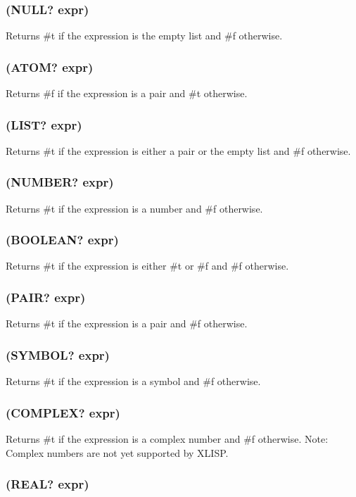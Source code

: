 \documentclass[11pt]{article}
\begin{document}
\subsubsection{(NULL? expr)}
\label{sec-4-23-1}

Returns \#t if the expression is the empty list and \#f otherwise.
\subsubsection{(ATOM? expr)}
\label{sec-4-23-2}

Returns \#f if the expression is a pair and \#t otherwise.
\subsubsection{(LIST? expr)}
\label{sec-4-23-3}

Returns \#t if the expression is either a pair or the empty list
and \#f otherwise.
\subsubsection{(NUMBER? expr)}
\label{sec-4-23-4}

Returns \#t if the expression is a number and \#f otherwise.
\subsubsection{(BOOLEAN? expr)}
\label{sec-4-23-5}

Returns \#t if the expression is either \#t or \#f and \#f otherwise.
\subsubsection{(PAIR? expr)}
\label{sec-4-23-6}

Returns \#t if the expression is a pair and \#f otherwise.
\subsubsection{(SYMBOL? expr)}
\label{sec-4-23-7}

Returns \#t if the expression is a symbol and \#f otherwise.
\subsubsection{(COMPLEX? expr)}
\label{sec-4-23-8}

Returns \#t if the expression is a complex number and \#f otherwise.
Note: Complex numbers are not yet supported by XLISP.
\subsubsection{(REAL? expr)}
\label{sec-4-23-9}
\end{document}

